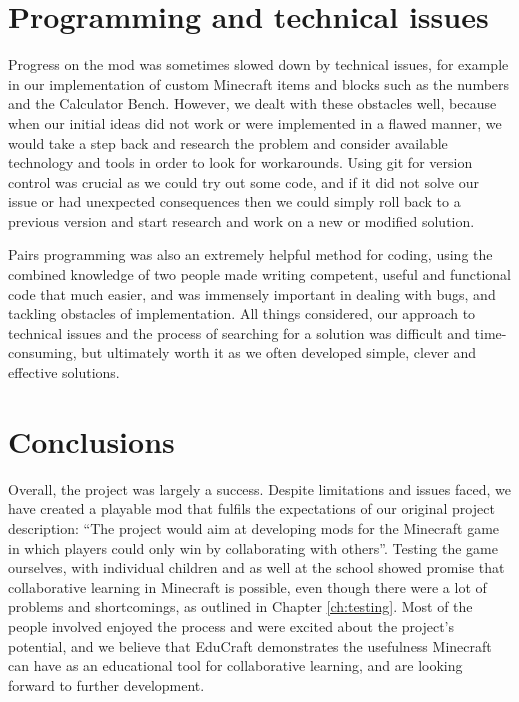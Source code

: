 \section{Programming and technical issues}
Progress on the mod was sometimes slowed down by technical issues, for example in our
implementation of custom Minecraft items and blocks such as the numbers and the
Calculator Bench. However, we dealt with these obstacles well, because when our initial
ideas did not work or were implemented in a flawed manner, we would take a step back and
research the problem and consider available technology and tools in order to look for
workarounds. Using git for version control was crucial as we could try out some code,
and if it did not solve our issue or had unexpected consequences then we could simply roll
back to a previous version and start research and work on a new or modified solution.

Pairs programming was also an extremely helpful method for coding, using the combined
knowledge of two people made writing competent, useful and functional code that much
easier, and was immensely important in dealing with bugs, and tackling obstacles of
implementation. All things considered, our approach to technical issues and the process of
searching for a solution was difficult and time-consuming, but ultimately worth it as
we often developed simple, clever and effective solutions.

\section{Conclusions}
Overall, the project was largely a success. Despite limitations and issues faced, we have
created a playable mod that fulfils the expectations of our original project description:
``The project would aim at developing mods for the Minecraft game in which players could
only win by collaborating with others''. Testing the game ourselves, with individual
children and as well at the school showed promise that collaborative learning in Minecraft
is possible, even though there were a lot of problems and shortcomings, as outlined in
Chapter \ref{ch:testing}. Most of the people involved enjoyed the process and were excited
about the project's potential, and we believe that EduCraft demonstrates the usefulness
Minecraft can have as an educational tool for collaborative learning, and are looking
forward to further development.
